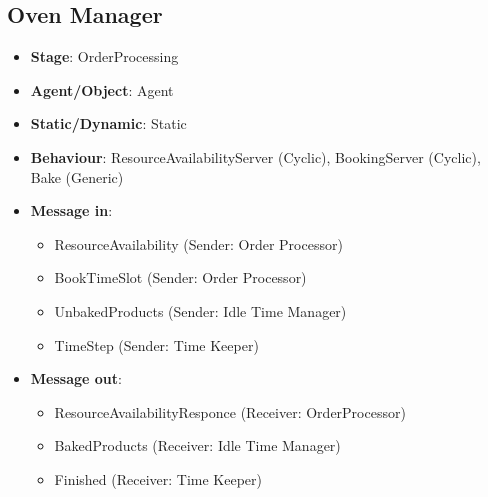 \documentclass[12pt]{article}
\begin{document}
\subsection{Oven Manager}%
\label{sub:over_manager}
\begin{itemize}
    \item \textbf{Stage}: OrderProcessing
    \item \textbf{Agent/Object}: Agent
    \item \textbf{Static/Dynamic}: Static
    \item \textbf{Behaviour}: ResourceAvailabilityServer (Cyclic), BookingServer (Cyclic), Bake (Generic)
    \item \textbf{Message in}:
        \begin{itemize}
            \item ResourceAvailability (Sender: Order Processor)
            \item BookTimeSlot (Sender: Order Processor)
            \item UnbakedProducts (Sender: Idle Time Manager)
            \item TimeStep (Sender: Time Keeper)
        \end{itemize}
    \item \textbf{Message out}:
        \begin{itemize}
            \item ResourceAvailabilityResponce (Receiver: OrderProcessor)
            \item BakedProducts (Receiver: Idle Time Manager)
            \item Finished (Receiver: Time Keeper)
        \end{itemize}
\end{itemize}
\end{document}
